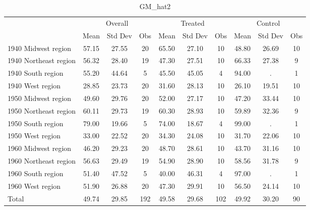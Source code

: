 \begin{table}[htbp]\centering
\def\sym#1{\ifmmode^{#1}\else\(^{#1}\)\fi}
\caption{GM\_hat2 \label{tab1}}
\begin{tabular}{l*{3}{ccc}}
\toprule
                    &\multicolumn{3}{c}{Overall}           &\multicolumn{3}{c}{Treated}           &\multicolumn{3}{c}{Control}           \\
                    &        Mean&     Std Dev&         Obs&        Mean&     Std Dev&         Obs&        Mean&     Std Dev&         Obs\\
\midrule
1940 Midwest region &       57.15&       27.55&          20&       65.50&       27.10&          10&       48.80&       26.69&          10\\
1940 Northeast region&       56.32&       28.40&          19&       47.30&       27.51&          10&       66.33&       27.38&           9\\
1940 South region   &       55.20&       44.64&           5&       45.50&       45.05&           4&       94.00&           .&           1\\
1940 West region    &       28.85&       23.73&          20&       31.60&       28.13&          10&       26.10&       19.51&          10\\
1950 Midwest region &       49.60&       29.76&          20&       52.00&       27.17&          10&       47.20&       33.44&          10\\
1950 Northeast region&       60.11&       29.73&          19&       60.30&       28.93&          10&       59.89&       32.36&           9\\
1950 South region   &       79.00&       19.66&           5&       74.00&       18.67&           4&       99.00&           .&           1\\
1950 West region    &       33.00&       22.52&          20&       34.30&       24.08&          10&       31.70&       22.06&          10\\
1960 Midwest region &       46.20&       29.23&          20&       48.70&       28.61&          10&       43.70&       31.16&          10\\
1960 Northeast region&       56.63&       29.49&          19&       54.90&       28.90&          10&       58.56&       31.78&           9\\
1960 South region   &       51.40&       47.52&           5&       40.00&       46.31&           4&       97.00&           .&           1\\
1960 West region    &       51.90&       26.88&          20&       47.30&       29.91&          10&       56.50&       24.14&          10\\
Total               &       49.74&       29.85&         192&       49.58&       29.68&         102&       49.92&       30.20&          90\\
\bottomrule
\end{tabular}
\end{table}
